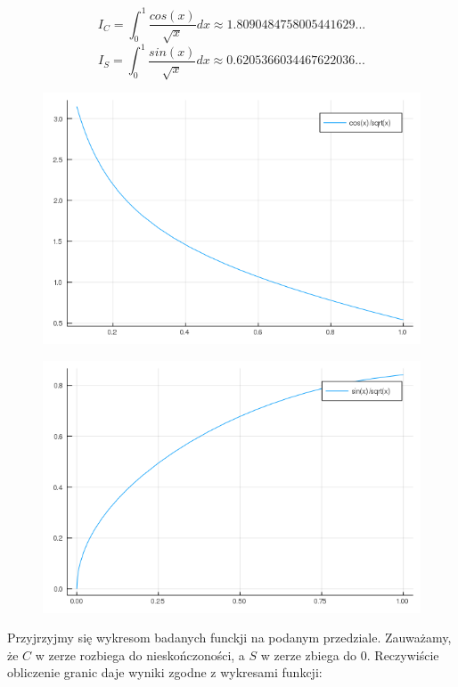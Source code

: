 \documentclass{article}
\begin{document}
\begin{equation}
I_C = \int_0^1 \frac{cos(x)}{\sqrt{x}} dx \approx 1.8090484758005441629...
\end{equation}
\begin{equation}
I_S = \int_0^1 \frac{sin(x)}{\sqrt{x}} dx \approx 0.6205366034467622036...
\end{equation}

\begin{figure}[ht]
    \includegraphics[scale=0.5]{WykresC.png}
    \label{wykresC}
\end{figure}
\begin{figure}[ht]
    \includegraphics[scale=0.5]{WykresS.png}
    \label{WykresS}
\end{figure}
Przyjrzyjmy się wykresom badanych funckji na podanym przedziale. Zauważamy, że $C$ w zerze rozbiega do nieskończoności, a $S$ w zerze zbiega do $0$. Reczywiście obliczenie granic daje wyniki zgodne z wykresami funkcji:
\end{document}
